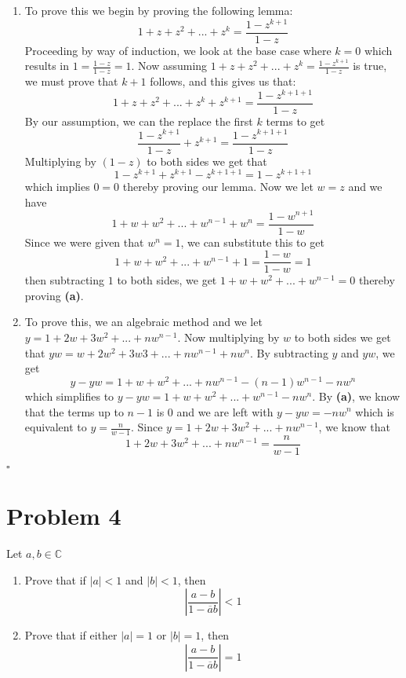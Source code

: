 \documentclass[12pt]{article}
\newcommand{\C}{\mathbb{C}}
\newenvironment{proof}{\noindent{\bf Proof.}}{\hfill $\square$\medskip}
\begin{document}
\begin{proof}
\begin{enumerate}[label=\textbf{(\alph*)}]
    \item To prove this we begin by proving the following lemma:
    $$1+z+z^{2}+...+z^{k}=\frac{1-z^{k+1}}{1-z}$$
    Proceeding by way of induction, we look at the base case where $k=0$ which results in $1=\frac{1-z}{1-z}=1$. Now assuming $1+z+z^{2}+...+z^{k}=\frac{1-z^{k+1}}{1-z}$ is true, we must prove that $k+1$ follows, and this gives us that:
    $$1+z+z^{2}+...+z^{k}+z^{k+1}=\frac{1-z^{k+1+1}}{1-z}$$By our assumption, we can the replace the first $k$ terms to get
    $$\frac{1-z^{k+1}}{1-z}+z^{k+1}=\frac{1-z^{k+1+1}}{1-z}$$Multiplying by $(1-z)$ to both sides we get that $$1-z^{k+1}+z^{k+1}-z^{k+1+1}=1-z^{k+1+1}$$ which implies $0=0$ thereby proving our lemma. Now we let $w=z$ and we have
    $$1+w+w^{2}+...+w^{n-1}+w^{n}=\frac{1-w^{n+1}}{1-w}$$
    Since we were given that $w^{n}=1$, we can substitute this to get
    $$1+w+w^{2}+...+w^{n-1}+1=\frac{1-w}{1-w}=1$$ then subtracting $1$ to both sides, we get $1+w+w^{2}+...+w^{n-1}=0$ thereby proving \textbf{(a)}.
    \item To prove this, we an algebraic method and we let $y = 1+2w+3w^{2}+...+nw^{n-1}$. Now multiplying by $w$ to both sides we get that $yw=w+2w^{2}+3w{3}+...+nw^{n-1}+nw^{n}$. By subtracting $y$ and $yw$, we get
    $$y-yw=1+w+w^{2}+...+nw^{n-1}-(n-1)w^{n-1}-nw^{n}$$
    which simplifies to $y-yw=1+w+w^{2}+...+w^{n-1}-nw^{n}$. By \textbf{(a)}, we know that the terms up to $n-1$ is $0$ and we are left with $y-yw=-nw^{n}$ which is equivalent to $y=\frac{n}{w-1}$. Since $y=1+2w+3w^{2}+...+nw^{n-1}$, we know that $$1+2w+3w^{2}+...+nw^{n-1}=\frac{n}{w-1}$$
\end{enumerate}
\end{proof}


\section{Problem 4}
Let $a,b\in \C$
\begin{enumerate}[label=\textbf{(\alph*)}]
    \item Prove that if $\lvert a\lvert<1$ and $\lvert b\rvert<1$, then
    $$\left|\frac{a-b}{1-\overline{a}{b}}\right|<1$$
    \item Prove that if either $\lvert a\rvert=1$ or $\lvert b\rvert=1$, then
    $$\left|\frac{a-b}{1-\overline{a}b}\right|=1$$
\end{enumerate}
\end{document}
